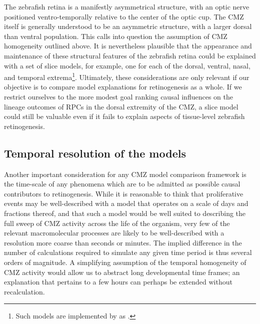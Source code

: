 The zebrafish retina is a manifestly asymmetrical structure, with an optic nerve positioned ventro-temporally relative to the center of the optic cup. The CMZ itself is generally understood to be an asymmetric structure, with a larger dorsal than ventral population. This calls into question the assumption of CMZ homogeneity outlined above. It is nevertheless plausible that the appearance and maintenance of these structural features of the zebrafish retina could be explained with a set of slice models, for example, one for each of the dorsal, ventral, nasal, and temporal extrema\footnote{Such models are implemented by \hyperref[chap:CNS]{} as .}. Ultimately, these considerations are only relevant if our objective is to compare model explanations for retinogenesis as a whole. If we restrict ourselves to the more modest goal ranking causal influences on the lineage outcomes of RPCs in the dorsal extremity of the CMZ, a slice model could still be valuable even if it fails to explain aspects of tissue-level zebrafish retinogenesis.

\FloatBarrier

\subsection{Temporal resolution of the models}
Another important consideration for any CMZ model comparison framework is the time-scale of any phenomena which are to be admitted as possible causal contributors to retinogenesis. While it is reasonable to think that proliferative events may be well-described with a model that operates on a scale of days and fractions thereof, and that such a model would be well suited to describing the full sweep of CMZ activity across the life of the organism, very few of the relevant macromolecular processes are likely to be well-described with a resolution more coarse than seconds or minutes. The implied difference in the number of calculations required to simulate any given time period is thus several orders of magnitude. A simplifying assumption of the temporal homogeneity of CMZ activity would allow us to abstract long developmental time frames; an explanation that pertains to a few hours can perhaps be extended without recalculation. 

